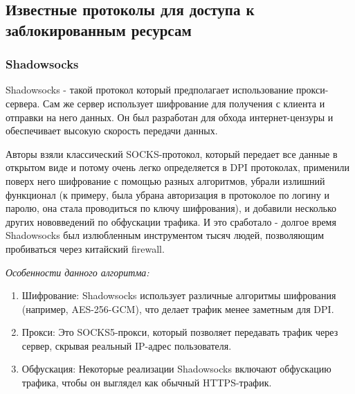 \documentclass[utf8,14pt,a4paper,oneside,russian]{book}
\begin{document}
\subsection{Известные протоколы для доступа к заблокированным ресурсам}

\subsubsection{Shadowsocks}
Shadowsocks - такой протокол который предполагает использование прокси-сервера. Сам же сервер использует шифрование для получения
с клиента и отправки на него данных. Он был разработан для обхода интернет-цензуры и обеспечивает высокую скорость передачи данных.

Авторы взяли классический SOCKS-протокол, который передает все данные в открытом виде и потому очень легко определяется в DPI протоколах,
применили поверх него шифрование с помощью разных алгоритмов, убрали излишний функционал (к примеру, была убрана авторизация в протоколое
по логину и паролю, она стала проводиться по ключу шифрования), и добавили несколько других нововведений по обфускации трафика. И это
сработало - долгое время Shadowsocks был излюбленным инструментом тысяч людей, позволяющим пробиваться через китайский firewall.

\textit{Особенности данного алгоритма:}
\begin{enumerate}
    \item Шифрование: Shadowsocks использует различные алгоритмы шифрования (например, AES-256-GCM), что делает трафик менее заметным для DPI.
    \item Прокси: Это SOCKS5-прокси, который позволяет передавать трафик через сервер, скрывая реальный IP-адрес пользователя.
    \item Обфускация: Некоторые реализации Shadowsocks включают обфускацию трафика, чтобы он выглядел как обычный HTTPS-трафик.
\end{enumerate}

\end{document}
